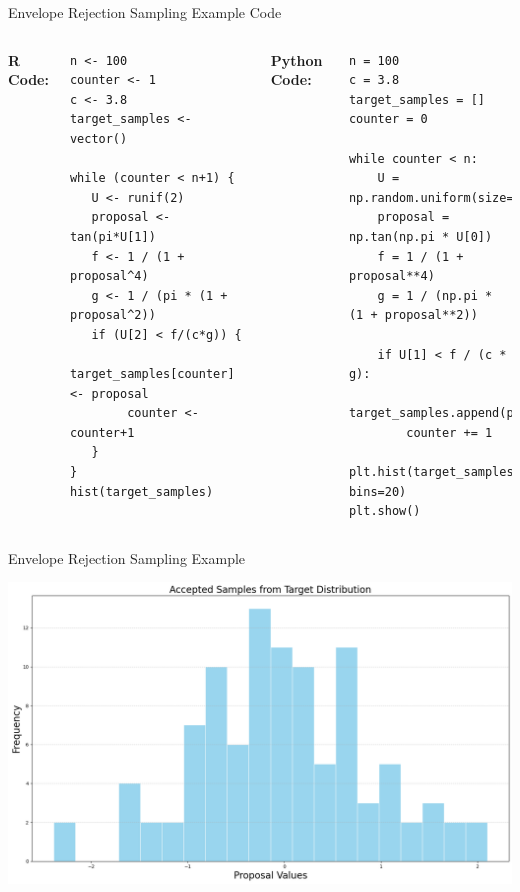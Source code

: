 \documentclass[8pt]{beamer}
\begin{document}
\begin{frame}[fragile]{Envelope Rejection Sampling Example}
\alert{Code}

\vspace{1mm}

\begin{columns}
{\bf R Code:}
\begin{lstlisting}
n <- 100
counter <- 1
c <- 3.8
target_samples <- vector()

while (counter < n+1) { 
   U <- runif(2)
   proposal <- tan(pi*U[1])
   f <- 1 / (1 + proposal^4)
   g <- 1 / (pi * (1 + proposal^2))
   if (U[2] < f/(c*g)) {
        target_samples[counter] <- proposal
        counter <- counter+1
   }
}
hist(target_samples)
\end{lstlisting}

{\bf Python Code:}
\begin{lstlisting}
n = 100
c = 3.8
target_samples = []
counter = 0

while counter < n:
    U = np.random.uniform(size=2)
    proposal = np.tan(np.pi * U[0])
    f = 1 / (1 + proposal**4)
    g = 1 / (np.pi * (1 + proposal**2))
    
    if U[1] < f / (c * g):
        target_samples.append(proposal)
        counter += 1

plt.hist(target_samples, bins=20)
plt.show()
\end{lstlisting}
\end{columns}
\end{frame}

\begin{frame}[fragile]{Envelope Rejection Sampling Example}
\begin{center}
\includegraphics[width=\textwidth]{chapter1-part3-plot4.png}
\end{center}
\end{frame}
\end{document}
